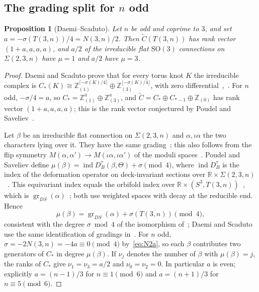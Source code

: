 \documentclass[11pt,reqno]{amsart}
\theoremstyle{plain}
\newtheorem{proposition}[theorem]{Proposition}
\theoremstyle{definition}
\newcommand{\R}{\mathbb{R}}
\newcommand{\Z}{\mathbb{Z}}
\newcommand{\SO}{\mathrm{SO}(3)}
\newcommand{\gr}{\operatorname{gr}}
\newcommand{\Sig}{\Sigma}
\begin{document}
\subsection{The grading split for \texorpdfstring{$n$}{n} odd}

\begin{proposition}[Daemi--Scaduto]\label{prop:split}
Let $n$ be odd and coprime to $3$, and set $a=-\sigma(T(3,n))/4=N(3,n)/2$. Then $\widetilde C(T(3,n))$ has
rank vector $(1+a,a,a,a)$, and $a/2$ of the irreducible flat $\SO$ connections on $\Sig(2,3,n)$ have
$\mu=1$ and $a/2$ have $\mu=3$.
\end{proposition}

\begin{proof}
Daemi and Scaduto prove that for every torus knot $K$ the irreducible complex is
$C_*(K)\cong\Z_{(1)}^{\lceil-\sigma(K)/4\rceil}\oplus\Z_{(3)}^{\lfloor-\sigma(K)/4\rfloor}$, with zero
differential~\cite[Cor.~3]{DScaduto},~\cite[\S9.5]{DSEquiv}. For $n$ odd, $-\sigma/4=a$, so
$C_*=\Z^a_{(1)}\oplus\Z^a_{(3)}$, and $\widetilde C=C_*\oplus C_{*-1}\oplus\Z_{(0)}$ has rank vector
$(1+a,a,a,a)$; this is the rank vector conjectured by Poudel and Saveliev~\cite[\S7.4]{PS}.

Let $\beta$ be an irreducible flat connection on $\Sig(2,3,n)$ and $\alpha,\iota\alpha$ the two characters
lying over it. They have the same grading~\cite[Lemma~6.4 and the paragraph following it]{PS}; this also
follows from the flip symmetry $M(\alpha,\alpha')\to M(\iota\alpha,\iota\alpha')$ of the moduli
spaces~\cite[\S9.1]{DSEquiv}. Poudel and Saveliev define
$\mu(\beta)=\operatorname{ind}D^\tau_B(\beta,\Theta)+\sigma\pmod4$, where $\operatorname{ind}D^\tau_B$ is
the index of the deformation operator on deck-invariant sections over
$\R\times\Sig(2,3,n)$~\cite[Prop.~6.5]{PS}. This equivariant index equals the orbifold index over
$\R\times(S^3,T(3,n))$~\cite[\S3.5, (7)]{PS}, which is $\gr_{DS}(\alpha)$~\cite[(2.11), (2.18)]{DSEquiv};
both use weighted spaces with decay at the reducible end. Hence
\[
\mu(\beta)=\gr_{DS}(\alpha)+\sigma(T(3,n))\pmod4,
\]
consistent with the degree $\sigma\bmod4$ of the isomorphism of~\cite[Thm.~8.9]{DSEquiv}; Daemi and
Scaduto use the same identification of gradings in~\cite[\S9.4]{DSEquiv}. For $n$ odd,
$\sigma=-2N(3,n)=-4a\equiv0\pmod4$ by~\eqref{eq:N2a}, so each $\beta$ contributes two generators of $C_*$
in degree $\mu(\beta)$. If $\nu_j$ denotes the number of $\beta$ with $\mu(\beta)=j$, the ranks of $C_*$
give $\nu_1=\nu_3=a/2$ and $\nu_0=\nu_2=0$. In particular $a$ is even; explicitly $a=(n-1)/3$ for
$n\equiv1\pmod6$ and $a=(n+1)/3$ for $n\equiv5\pmod6$.
\end{proof}
\end{document}
